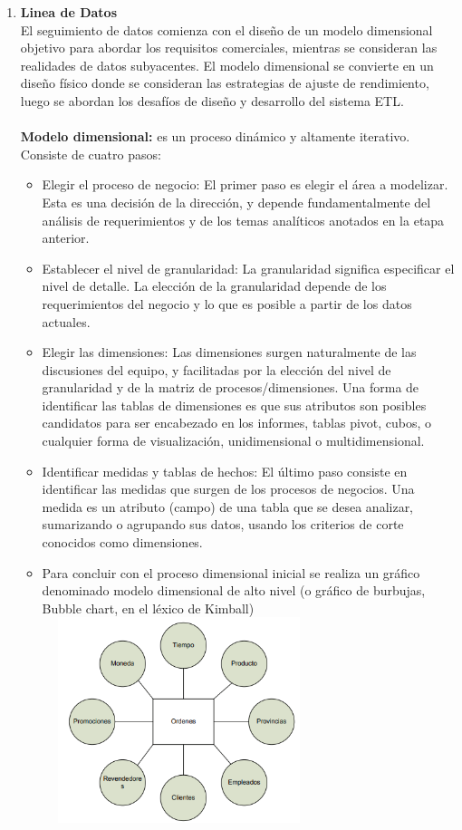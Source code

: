 \documentclass[twoside,twocolumn]{article}
\begin{document}
\begin{enumerate}
 \item \textbf{Linea de Datos}\\
El seguimiento de datos comienza con el diseño de un modelo dimensional objetivo para abordar los requisitos comerciales, mientras se consideran las realidades de datos subyacentes. El modelo dimensional se convierte en un diseño físico donde se consideran las estrategias de ajuste de rendimiento, luego se abordan los desafíos de diseño y desarrollo del sistema ETL.\\ \\
\textbf{Modelo dimensional:} es un proceso dinámico y altamente iterativo. Consiste de cuatro pasos:
\begin{itemize}
	\item Elegir el proceso de negocio: El primer paso es elegir el área a modelizar. Esta es una decisión de la dirección, y depende fundamentalmente del análisis de requerimientos y de los temas analíticos anotados en la etapa anterior. 
	\item Establecer el nivel de granularidad: La granularidad significa especificar el nivel de detalle. La elección de la granularidad depende de los requerimientos del negocio y lo que es posible a partir de los datos actuales.
	\item Elegir las dimensiones: Las dimensiones surgen naturalmente de las discusiones del equipo, y facilitadas por la elección del nivel de granularidad y de la matriz de procesos/dimensiones. Una forma de identificar las tablas de dimensiones es que sus atributos
son posibles candidatos para ser encabezado en los informes, tablas pivot, cubos, o cualquier forma de visualización, unidimensional o
multidimensional.
	\item Identificar medidas y tablas de hechos: El último paso consiste en identificar las medidas que surgen de
los procesos de negocios. Una medida es un atributo (campo) de una tabla que se desea analizar, sumarizando o agrupando sus datos,
usando los criterios de corte conocidos como dimensiones.
	\item Para concluir con el proceso dimensional inicial se realiza un gráfico denominado modelo dimensional de alto nivel (o gráfico de burbujas, Bubble chart, en el léxico de Kimball)
\includegraphics[width=8cm, height=6cm]{Imagenes/2}

\end{itemize}
\end{enumerate}
\end{document}
